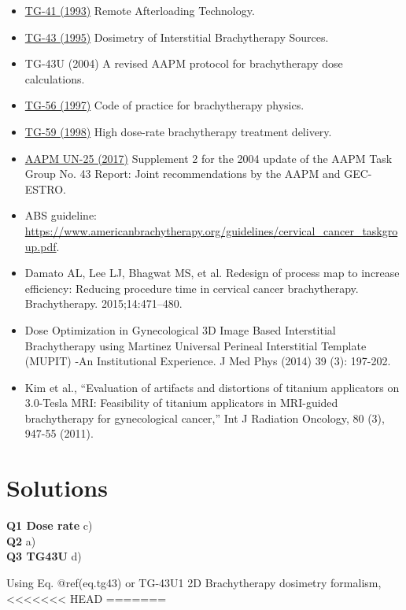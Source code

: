 \documentclass[]{book}
\providecommand{\tightlist}{%
  \setlength{\itemsep}{0pt}\setlength{\parskip}{0pt}}
\theoremstyle{definition}
\theoremstyle{definition}
\theoremstyle{definition}
\theoremstyle{remark}
\begin{document}
\begin{itemize}
\tightlist
\item
  \href{https://www.aapm.org/pubs/reports/rpt_41.pdf}{TG-41 (1993)}
  Remote Afterloading Technology.
\item
  \href{https://www.aapm.org/pubs/reports/detail.asp?docid=50}{TG-43
  (1995)} Dosimetry of Interstitial Brachytherapy Sources.
\item
  TG-43U (2004) A revised AAPM protocol for brachytherapy dose
  calculations.
\item
  \href{https://www.aapm.org/pubs/reports/detail.asp?docid=58\#}{TG-56
  (1997)} Code of practice for brachytherapy physics.
\item
  \href{https://pdfs.semanticscholar.org/5a32/c14e0720d3e5af0747e5a191845683b3feca.pdf}{TG-59
  (1998)} High dose-rate brachytherapy treatment delivery.
\item
  \href{https://www.aapm.org/pubs/reports/detail.asp?docid=167}{AAPM
  UN-25 (2017)} Supplement 2 for the 2004 update of the AAPM Task Group
  No. 43 Report: Joint recommendations by the AAPM and GEC-ESTRO.
\item
  ABS guideline:
  \url{https://www.americanbrachytherapy.org/guidelines/cervical_cancer_taskgroup.pdf}.
\item
  Damato AL, Lee LJ, Bhagwat MS, et al. Redesign of process map to
  increase efficiency: Reducing procedure time in cervical cancer
  brachytherapy. Brachytherapy. 2015;14:471--480.
\item
  Dose Optimization in Gynecological 3D Image Based Interstitial
  Brachytherapy using Martinez Universal Perineal Interstitial Template
  (MUPIT) -An Institutional Experience. J Med Phys (2014) 39 (3):
  197-202.
\item
  Kim et al., ``Evaluation of artifacts and distortions of titanium
  applicators on 3.0-Tesla MRI: Feasibility of titanium applicators in
  MRI-guided brachytherapy for gynecological cancer,'' Int J Radiation
  Oncology, 80 (3), 947-55 (2011).
\end{itemize}

\section{Solutions}\label{solutions-1}

\textbf{Q1 Dose rate} c)\\
\textbf{Q2} a)\\
\textbf{Q3 TG43U } d)

Using Eq. @ref(eq.tg43) or TG-43U1 2D Brachytherapy dosimetry formalism,
\textless{}\textless{}\textless{}\textless{}\textless{}\textless{}\textless{}
HEAD =======
\end{document}
